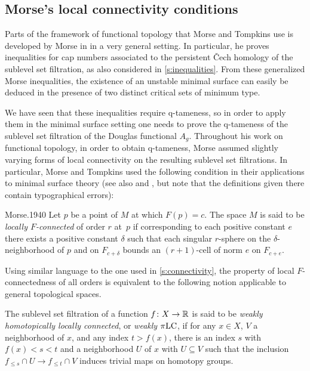 \subsection{Morse's local connectivity conditions}

Parts of the framework of functional topology that Morse and Tompkins use is developed by Morse in \cite{Morse.1940} in a very general setting.
In particular, he proves inequalities for cap numbers associated to the persistent \v{C}ech homology of the sublevel set filtration, as also considered in \cref{s:inequalities}.
From these generalized Morse inequalities, the existence of an unstable minimal surface can easily be deduced in the presence of two distinct critical sets of minimum type.

We have seen that these inequalities require q-tameness, so in order to apply them in the minimal surface setting %
one needs to prove the \mbox{q-tameness} of the sublevel set filtration of the Douglas functional $A_g$.
Throughout his work on functional topology, in order to obtain \mbox{q-tameness}, Morse assumed slightly varying forms of local connectivity on the resulting sublevel set filtrations.
In particular, Morse and Tompkins used the following condition in their applications to minimal surface theory (see also \cite[p.~ 25]{Morse.1938} and \cite[p.~464]{Morse.1939}, but note that the definitions given there contain typographical errors):
\begin{displaycquote}[p.~431]{Morse.1940}
	Let $p$ be a point of $M$ at which $F(p)=c$.
	The space $M$ is said to be \emph{locally $F$-connected} of order $r$ at~$p$ if corresponding to each positive constant $e$ there exists a positive constant $\delta$ such that each singular $r$-sphere on the $\delta$-neighborhood of $p$ and on $F_{c+\delta}$ bounds an $(r+1)$-cell of norm $e$ on $F_{c+e}$.
\end{displaycquote}
Using similar language to the one used in \cref{s:connectivity}, the property of local $F$-connectedness of all orders is equivalent to the following notion applicable to general topological spaces.

\begin{defi}
	The sublevel set filtration of a function $f \colon X \to \mathbb{R}$ is said to be \emph{weakly homotopically locally connected}, or \emph{weakly $\pi\mathrm{LC}$}, if for any $x \in X$, $V$ a neighborhood of $x$, and any index $t > f(x)$, there is an index $s$ with $f(x) < s < t$ and a neighborhood $U$ of $x$ with $U \subseteq V$ such that the inclusion $f_{\leq s} \cap U \to f_{\leq t} \cap V$ induces trivial maps on homotopy groups.
\end{defi}

